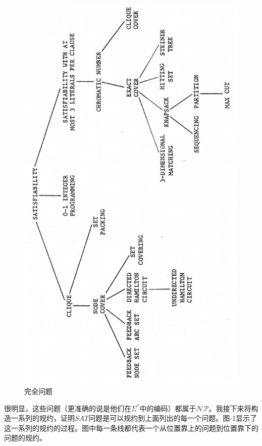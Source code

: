\documentclass[twocolumn]{article}
\theoremstyle{nonumberplain}%
\begin{document}
\begin{CJK}{UTF8}{gbsn}
    \begin{figure}
        \centering
        \includegraphics[width=12cm]{complete_problems.png}
        \caption{完全问题}
    \end{figure}

    很明显，这些问题（更准确的说是他们在$\Sigma^*$中的编码）都属于$\mathcal{NP}$。我接下来将构造一系列的规约，证明$SAT$问题是可以规约到上面列出的每一个问题。图-1显示了这一系列的规约的过程。图中每一条线都代表一个从位置靠上的问题到位置靠下的问题的规约。


\end{CJK}
\end{document}
